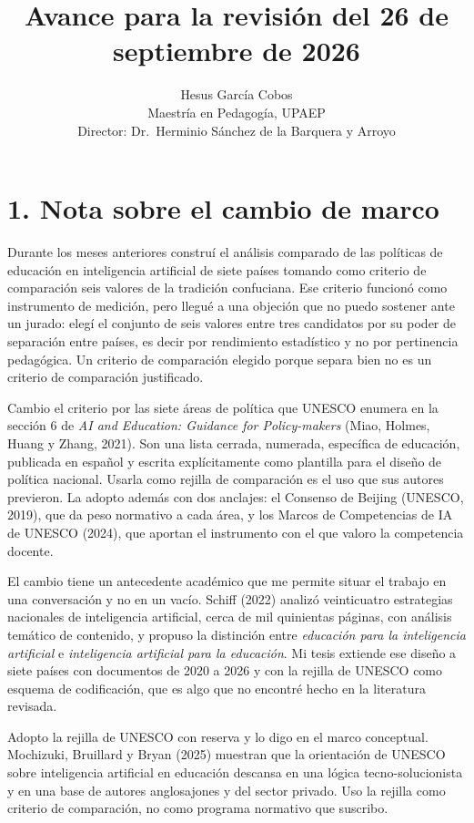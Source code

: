 \documentclass[12pt,letterpaper]{article}
\title{\vspace{-2.5cm}\large Avance para la revisión del 26 de septiembre de 2026}
\author{\normalsize Hesus García Cobos\\[2pt]
\footnotesize Maestría en Pedagogía, UPAEP\\
\footnotesize Director: Dr.\ Herminio Sánchez de la Barquera y Arroyo}
\date{}
\begin{document}
\maketitle
\thispagestyle{empty}

\section*{1. Nota sobre el cambio de marco}

Durante los meses anteriores construí el análisis comparado de las políticas de educación en
inteligencia artificial de siete países tomando como criterio de comparación seis valores de la
tradición confuciana. Ese criterio funcionó como instrumento de medición, pero llegué a una
objeción que no puedo sostener ante un jurado: elegí el conjunto de seis valores entre tres
candidatos por su poder de separación entre países, es decir por rendimiento estadístico y no por
pertinencia pedagógica. Un criterio de comparación elegido porque separa bien no es un criterio
de comparación justificado.

Cambio el criterio por las siete áreas de política que UNESCO enumera en la sección 6 de
\textit{AI and Education: Guidance for Policy-makers} (Miao, Holmes, Huang y Zhang, 2021). Son
una lista cerrada, numerada, específica de educación, publicada en español y escrita
explícitamente como plantilla para el diseño de política nacional. Usarla como rejilla de
comparación es el uso que sus autores previeron. La adopto además con dos anclajes: el Consenso
de Beijing (UNESCO, 2019), que da peso normativo a cada área, y los Marcos de Competencias de IA
de UNESCO (2024), que aportan el instrumento con el que valoro la competencia docente.

El cambio tiene un antecedente académico que me permite situar el trabajo en una conversación y
no en un vacío. Schiff (2022) analizó veinticuatro estrategias nacionales de inteligencia
artificial, cerca de mil quinientas páginas, con análisis temático de contenido, y propuso la
distinción entre \textit{educación para la inteligencia artificial} e \textit{inteligencia
artificial para la educación}. Mi tesis extiende ese diseño a siete países con documentos de 2020
a 2026 y con la rejilla de UNESCO como esquema de codificación, que es algo que no encontré hecho
en la literatura revisada.

Adopto la rejilla de UNESCO con reserva y lo digo en el marco conceptual. Mochizuki, Bruillard y
Bryan (2025) muestran que la orientación de UNESCO sobre inteligencia artificial en educación
descansa en una lógica tecno-solucionista y en una base de autores anglosajones y del sector
privado. Uso la rejilla como criterio de comparación, no como programa normativo que suscribo.
\end{document}
